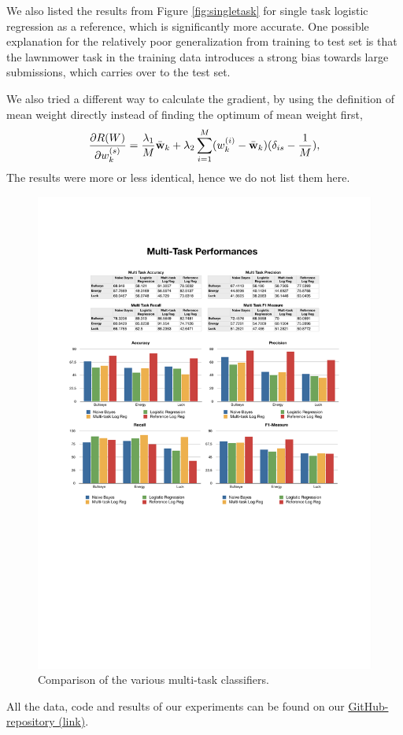We also listed the results from Figure \ref{fig:singletask} for single task logistic regression as a reference, which is significantly more accurate. One possible explanation for the relatively poor generalization from training to test set is that the lawnmower task in the training data introduces a strong bias towards large submissions, which carries over to the test set.

We also tried a different way to calculate the gradient, by using the definition of mean weight directly instead of finding the optimum of mean weight first, 
\begin{align*}
\frac{\partial R(W)}{\partial w_k^{(s)}} = \frac{\lambda_1}{M} \bar{\textbf{w}}_k + \lambda_2 \sum_{i=1}^{M}(w_k^{(i)} - \bar{\textbf{w}}_k)(\delta_{is} - \frac{1}{M}),
\end{align*}
The results were more or less identical, hence we do not list them here.
%
\begin{figure}
    \centering
    \setlength{\tabcolsep}{0.0130\linewidth}
    \includegraphics[width=\linewidth]{figures/MultiTask}
    \caption{Comparison of the various multi-task classifiers.%
      \label{fig:multitask}}
\end{figure}


All the data, code and results of our experiments can be found on our 
\href{https://github.com/johnnyyan/515project}{GitHub-repository (link)}.

